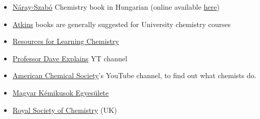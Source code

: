 \documentclass{article}
\begin{document}
\begin{itemize}
    \item \href{https://bookline.hu/product/home.action?_v=Naray_Szabo_Gabor_Kemia&type=22&id=48903}{Náray-Szabó} Chemistry book in Hungarian (online available \href{https://www.scribd.com/doc/249972941/Kemia-Naray-Szabo-Gabor}{here})
    
    \item \href{https://www.goodreads.com/author/show/7164718.Peter_Atkins}{Atkins} books are generally suggested for University chemistry courses
    
    \item \href{https://chemistry.stackexchange.com/questions/37303/resources-for-learning-chemistry}{Resources for Learning Chemistry}
    
    \item \href{https://www.youtube.com/channel/UC0cd_-e49hZpWLH3UIwoWRA}{Professor Dave Explains} YT channel
    
    \item \href{https://www.youtube.com/user/AmerChemSoc/playlists?view=50&sort=dd&shelf_id=16}{American Chemical Society}'s YouTube channel, to find out what chemists do.
    
    \item \href{https://www.mke.org.hu/index.php}{Magyar Kémikusok Egyesülete}
    
    \item \href{https://www.rsc.org/}{Royal Society of Chemistry} (UK)
    

\end{itemize}
\end{document}
